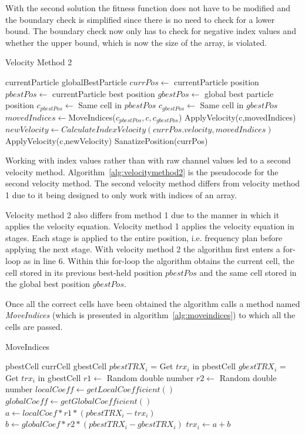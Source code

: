With the second solution the fitness function does not have to be modified and the boundary check is simplified since there is no need to check for a lower bound. The boundary check now only has to check for negative index values and whether the upper bound, which is now the size of the array, is violated.
\begin{algorithm}
\caption{Velocity Method 2}
\label{alg:velocitymethod2}
\begin{algorithmic}[1]
	\Require currentParticle
	\Require globalBestParticle
	\State $currPos \leftarrow$ currentParticle position
	\State $pbestPos \leftarrow$ currentParticle best position
	\State $gbestPos \leftarrow$ global best particle position
		\State $c_{pbestPos} \leftarrow $ Same cell in $pbestPos$
		\State $c_{gbestPos} \leftarrow $ Same cell in $gbestPos$
		\State $movedIndices \leftarrow $MoveIndices($c_{pbestPos},c,c_{gbestPos}$)
			\State ApplyVelocity(c,movedIndices)
		\Else
			\State $newVelocity \leftarrow CalculateIndexVelocity(currPos.velocity,movedIndices)$
			\State ApplyVelocity(c,newVelocity)
		\EndIf
	\EndFor
	\State SanatizePosition(currPos)
\end{algorithmic}
\end{algorithm}
Working with index values rather than with raw channel values led to  a second velocity method. Algorithm~\ref{alg:velocitymethod2} is the pseudocode for the second velocity method. The second velocity method differs from velocity method 1 due to it being designed to only work with indices of an array.

Velocity method 2 also differs from method 1 due to the manner in which it applies the velocity equation. Velocity method 1 applies the velocity equation in stages. Each stage is applied to the entire position, i.e. frequency plan before applying the next stage. With velocity method 2 the algorithm first enters a for-loop as in line 6. Within this for-loop the algorithm obtains the current cell, the cell stored in its previous best-held position $pbestPos$ and the same cell stored in the global best position $gbestPos$.

Once all the correct cells have been obtained the algorithm calls a method named \emph{MoveIndices} (which is presented in algorithm~\ref{alg:moveindices}) to which all the cells are passed.
\begin{algorithm}
\caption {MoveIndices}
\label{alg:moveindices}
\begin{algorithmic}[1]
	\Require pbestCell
	\Require currCell
	\Require gbestCell
		\State $pbestTRX_i$ = Get $trx_i$ in pbestCell
		\State $gbestTRX_i$ = Get $trx_i$ in gbestCell
		\State $r1 \leftarrow$ Random double number
		\State $r2 \leftarrow$ Random double number
		\State $localCoeff \leftarrow getLocalCoefficient()$
		\State $globalCoeff \leftarrow getGlobalCoefficient()$
		\State $a \leftarrow localCoef * r1 * (pbestTRX_i - trx_i)$
		\State $b \leftarrow globalCoef * r2 * (pbestTRX_i - gbestTRX_i)$
		\State $trx_i \leftarrow a + b$
	\EndFor
\end{algorithmic}
\end{algorithm}

